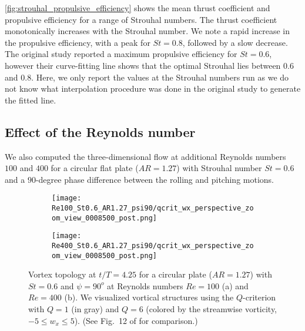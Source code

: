 \cref{fig:strouhal_propulsive_efficiency} shows the mean thrust coefficient and propulsive efficiency for a range of Strouhal numbers.
The thrust coefficient monotonically increases with the Strouhal number.
We note a rapid increase in the propulsive efficiency, with a peak for $St = 0.8$, followed by a slow decrease.
The original study reported a maximum propulsive efficiency for $St = 0.6$, however their curve-fitting line shows that the optimal Strouhal lies between $0.6$ and $0.8$.
Here, we only report the values at the Strouhal numbers run as we do not know what interpolation procedure was done in the original study to generate the fitted line.

\subsection{Effect of the Reynolds number}

We also computed the three-dimensional flow at additional Reynolds numbers $100$ and $400$ for a circular flat plate ($AR = 1.27$) with Strouhal number $St = 0.6$ and a $90$-degree phase difference between the rolling and pitching motions.

\begin{figure}[!h]
  \centering
  \begin{subfigure}[c]{0.45\textwidth}
    \centering
    \texttt{[image: Re100\_St0.6\_AR1.27\_psi90/qcrit\_wx\_perspective\_zoom\_view\_0008500\_post.png]}
    \caption{}
    \label{fig:reynolds_wake_topology:100_perspective}
  \end{subfigure}
  \hfill
  \begin{subfigure}[c]{0.45\textwidth}
    \centering
    \texttt{[image: Re400\_St0.6\_AR1.27\_psi90/qcrit\_wx\_perspective\_zoom\_view\_0008500\_post.png]}
    \caption{}
    \label{fig:reynolds_wake_topology:400_perspective}
  \end{subfigure}
  \caption{Vortex topology at $t / T = 4.25$ for a circular plate ($AR = 1.27$) with $St = 0.6$ and $\psi = 90^o$ at Reynolds numbers $Re = 100$ (a) and $Re = 400$ (b). We visualized vortical structures using the $Q$-criterion with $Q = 1$ (in gray) and $Q = 6$ (colored by the streamwise vorticity, $-5 \leq w_x \leq 5$). (See Fig.~12 of \citet{li_dong_2016} for comparison.)}
  \label{fig:reynolds_wake_topology}
\end{figure}

